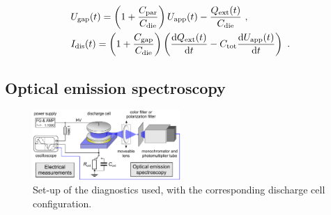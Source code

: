 \documentclass[a4paper,10pt,twoside]{article}
\newcommand{\diff}{\textnormal{d}}
\newcommand{\ix}[1]{_\text{#1}}
\begin{document}
				\begin{align*}
					 &U\ix{gap}(t)=\left(1+\frac{C\ix{par}}{C\ix{die}}\right)U\ix{app}(t)-\frac{Q\ix{ext}(t)}{C\ix{die}} \,\, , \\
					 &I\ix{dis}(t)=\left(1+\frac{C\ix{gap}}{C\ix{die}}\right)\left(\frac{\diff Q\ix{ext}(t)}{\diff t}-C\ix{tot}\frac{\diff U\ix{app}(t)}{\diff t}\right) \,\, .
				\end{align*}	

		\subsection{Optical emission spectroscopy}\label{subsec:oes}
		
				\begin{figure}
					\centering
					\includegraphics[width=0.5\textwidth]{figures/setup/setup.pdf}
					\caption{Set-up of the diagnostics used, with the corresponding discharge cell configuration.}
					\label{img:diag}
				\end{figure}
		
\end{document}
